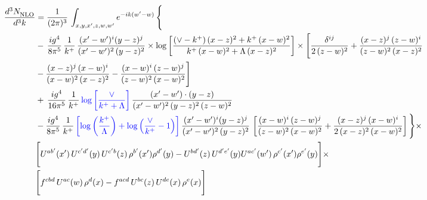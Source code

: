 \documentclass[9pt]{article}
\numberwithin{equation}{section}
\begin{document}
\begin{align}
     \frac{d^{3}N_{\rm NLO}^{\rm}}{d^{3}k}  & =  \frac{1}{(2\pi)^{3}}\, \int_{x,y,x',z,w,w^{\prime}} e^{-ik(w^{\prime}-w)}\, \Bigg\{\notag \\ & -\,\frac{ig^{4}}{8\pi^{5}}\,\frac{1}{k^{+}}\,\frac{(x'-w')^{i}(y-z)^{j}}{(x'-w')^{2}\,(y-z)^{2}}\times \log{\left[\frac{(\vee-k^{+})\,(x-z)^{2}+k^{+}\,(x-w)^{2}}{k^{+}\,(x-w)^{2}+\Lambda\, (x-z)^{2}}\right]}\times \Bigg[\frac{\delta^{ij}}{2\,(z-w)^{2}}+\frac{(x-z)^{j}\,(z-w)^{i}}{(z-w)^{2}\,(x-z)^{2}}\notag \\ & -\frac{(x-z)^{j}\,(x-w)^{i}}{(x-w)^{2}\,(x-z)^{2}}-\frac{(x-w)^{i}\,(z-w)^{j}}{(z-w)^{2}\,(x-w)^{2}}\Bigg]\notag \\ & +\,\frac{ig^{4}}{16\pi^{5}}\,\frac{1}{k^{+}}\,{\color{blue}\log{\left[\frac{\vee}{k^{+}+\Lambda}\right]}}\, \frac{(x'-w')\cdot (y-z)}{(x'-w')^{2}\,(y-z)^{2}\,(z-w)^{2}}\notag \\ & -\frac{ig^{4}}{8\pi^{5}}\,\frac{1}{k^{+}}\,{\color{blue}\left[\log{\left(\frac{k^{+}}{\Lambda}\right)}+\log{\left(\frac{\vee}{k^{+}}-1\right)}\right]}\,\frac{(x'-w')^{i}(y-z)^{j}}{(x'-w')^{2}\,(y-z)^{2}}\,\left[\frac{(x-w)^{i}\,(z-w)^{j}}{(z-w)^{2}\,(x-w)^{2}}+\frac{(x-z)^{j}\,(x-w)^{i}}{2\,(x-z)^{2}\, (x-w)^{2}}\right]\Bigg\}\times \notag \\ &  \Bigg[U^{ab'}(x')\,U^{c'd'}(y)\,U^{c'b}(z)\,\rho^{b'}(x')\rho^{d'}(y)-U^{bd'}(z)\,U^{d'e'}(y)U^{ac'}(w')\,\rho^{c'}(x')\rho^{e'}(y)\Bigg]\times\notag \\ & \Bigg[f^{cbd}\,U^{ac}(w)\,\rho^{d}(x)-f^{acd}\, U^{bc}(z)\,U^{de}(x)\,\rho^{e}(x)\Bigg] 
\end{align}
\end{document}
